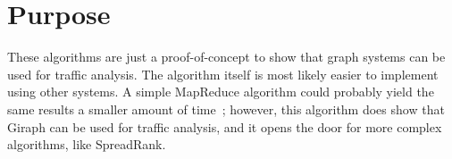 \section{Purpose}
These algorithms are just a proof-of-concept to show that graph systems can be used for traffic analysis.
The algorithm itself is most likely easier to implement using other systems.
A simple MapReduce algorithm could probably yield the same results a smaller amount of time~\cite{Morken352472};
however, this algorithm does show that Giraph can be used for traffic analysis,
 and it opens the door for more complex algorithms, like SpreadRank.


